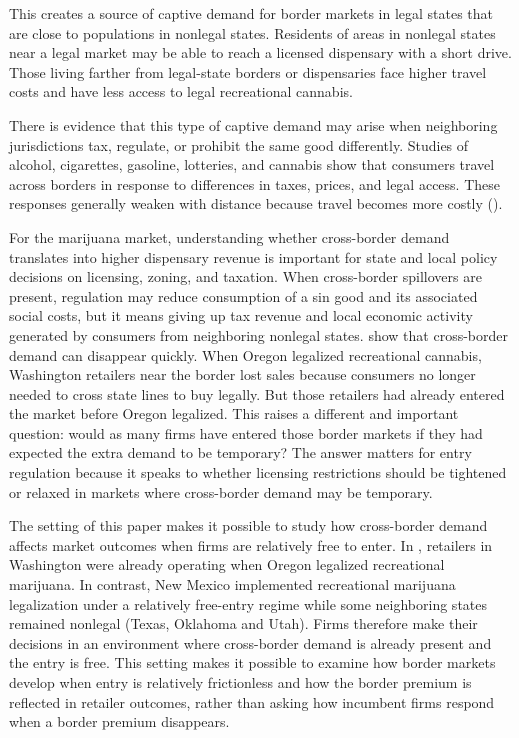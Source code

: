 \documentclass[12pt]{article}
\begin{document}
This creates a source of captive demand for border markets in legal states that are close to populations in nonlegal states. Residents of areas in nonlegal states near a legal market may be able to reach a licensed dispensary with a short drive. Those living farther from legal-state borders or dispensaries face higher travel costs and have less access to legal recreational cannabis.

There is evidence that this type of captive demand may arise when neighboring jurisdictions tax, regulate, or prohibit the same good differently. Studies of alcohol, cigarettes, gasoline, lotteries, and cannabis show that consumers travel across borders in response to differences in taxes, prices, and legal access. These responses generally weaken with distance because travel becomes more costly (\cite{AsplundFribergWilander2007, Lovenheim2008, BeattyLarsenSommervoll2009, ChandraHeadTappata2014}).

For the marijuana market, understanding whether cross-border demand translates into higher dispensary revenue is important for state and local policy decisions on licensing, zoning, and taxation. When cross-border spillovers are present, regulation may reduce consumption of a sin good and its associated social costs, but it means giving up tax revenue and local economic activity generated by consumers from neighboring nonlegal states. \cite{HansenMillerWeber2020} show that cross-border demand can disappear quickly. When Oregon legalized recreational cannabis, Washington retailers near the border lost sales because consumers no longer needed to cross state lines to buy legally. But those retailers had already entered the market before Oregon legalized. This raises a different and important question: would as many firms have entered those border markets if they had expected the extra demand to be temporary? The answer matters for entry regulation because it speaks to whether licensing restrictions should be tightened or relaxed in markets where cross-border demand may be temporary.

The setting of this paper makes it possible to study how cross-border demand affects market outcomes when firms are relatively free to enter. In \cite{HansenMillerWeber2020}, retailers in Washington were already operating when Oregon legalized recreational marijuana.
 In contrast, New Mexico implemented recreational marijuana legalization under a relatively free-entry regime while some neighboring states remained nonlegal (Texas, Oklahoma and Utah). Firms therefore make their decisions in an environment where cross-border demand is already present and the entry is free. This setting makes it possible to examine how border markets develop when entry is relatively frictionless and how the border premium is reflected in retailer outcomes, rather than asking how incumbent firms respond when a border premium disappears.
\end{document}
